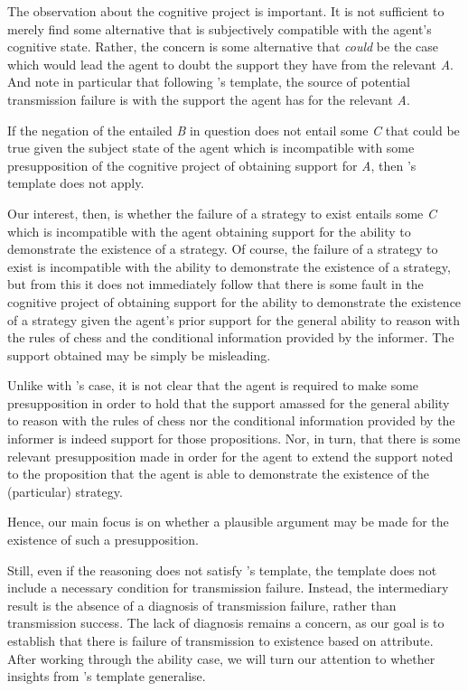 \documentclass[10pt]{article}
\begin{document}
\begin{note}
  The observation about the cognitive project is important.
  It is not sufficient to merely find some alternative that is subjectively compatible with the agent's cognitive state.
  Rather, the concern is some alternative that \emph{could} be the case which would lead the agent to doubt the support they have from the relevant \emph{A}.
  And note in particular that following \citeauthor{Wright:2011wn}'s template, the source of potential transmission failure is with the support the agent has for the relevant \emph{A}.

  If the negation of the entailed \emph{B} in question does not entail some \emph{C} that could be true given the subject state of the agent which is incompatible with some presupposition of the cognitive project of obtaining support for \emph{A}, then \citeauthor{Wright:2011wn}'s template does not apply.

  Our interest, then, is whether the failure of a strategy to exist entails some \emph{C} which is incompatible with the agent obtaining support for the ability to demonstrate the existence of a strategy.
  Of course, the failure of a strategy to exist is incompatible with the ability to demonstrate the existence of a strategy, but from this it does not immediately follow that there is some fault in the cognitive project of obtaining support for the ability to demonstrate the existence of a strategy given the agent's prior support for the general ability to reason with the rules of chess and the conditional information provided by the informer.
  The support obtained may be simply be misleading.

  Unlike with \citeauthor{Dretske:2005vy}'s case, it is not clear that the agent is required to make some presupposition in order to hold that the support amassed for the general ability to reason with the rules of chess nor the conditional information provided by the informer is indeed support for those propositions.
  Nor, in turn, that there is some relevant presupposition made in order for the agent to extend the support noted to the proposition that the agent is able to demonstrate the existence of the (particular) strategy.

  Hence, our main focus is on whether a plausible argument may be made for the existence of such a presupposition.

  Still, even if the reasoning does not satisfy \citeauthor{Wright:2011wn}'s template, the template does not include a necessary condition for transmission failure.
  Instead, the intermediary result is the absence of a diagnosis of transmission failure, rather than transmission success.
  The lack of diagnosis remains a concern, as our goal is to establish that there is failure of transmission to existence based on attribute.
  After working through the ability case, we will turn our attention to whether insights from \citeauthor{Wright:2011wn}'s template generalise.
\end{note}
\end{document}
